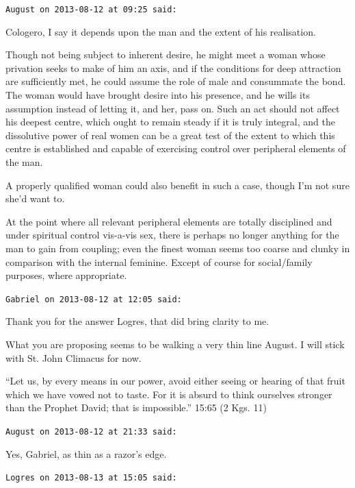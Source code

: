\begin{footnotesize}
\begin{sffamily}
\hfill

\texttt{August on 2013-08-12 at 09:25 said:}

Cologero, I say it depends upon the man and the extent of his realisation.

Though not being subject to inherent desire, he might meet a woman whose privation seeks to make of him an axis, and if the conditions for deep attraction are sufficiently met, he could assume the role of male and consummate the bond. The woman would have brought desire into his presence, and he wills its assumption instead of letting it, and her, pass on. Such an act should not affect his deepest centre, which ought to remain steady if it is truly integral, and the dissolutive power of real women can be a great test of the extent to which this centre is established and capable of exercising control over peripheral elements of the man.

A properly qualified woman could also benefit in such a case, though I'm not sure she'd want to.

At the point where all relevant peripheral elements are totally disciplined and under spiritual control vis-a-vis sex, there is perhaps no longer anything for the man to gain from coupling; even the finest woman seems too coarse and clunky in comparison with the internal feminine. Except of course for social/family purposes, where appropriate.

\hfill

\texttt{Gabriel on 2013-08-12 at 12:05 said:}

Thank you for the answer Logres, that did bring clarity to me.

What you are proposing seems to be walking a very thin line August. I will stick with St. John Climacus for now.

``Let us, by every means in our power, avoid either seeing or hearing of that fruit which we have vowed not to taste. For it is absurd to think ourselves stronger than the Prophet David; that is impossible.'' 15:65 (2 Kgs. 11)

\hfill

\texttt{August on 2013-08-12 at 21:33 said:}

Yes, Gabriel, as thin as a razor's edge.

\hfill

\texttt{Logres on 2013-08-13 at 15:05 said:}


\end{sffamily}
\end{footnotesize}
